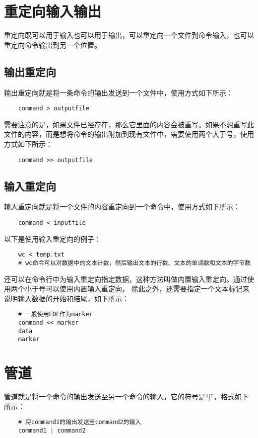 \documentclass[a4paper,left=2.5cm,right=2.5cm,11pt]{article}
\begin{document}
\section{重定向输入输出}
	重定向既可以用于输入也可以用于输出，可以重定向一个文件到命令输入，也可以重定向命令输出到另一个位置。

\subsection{输出重定向}
	输出重定向就是将一条命令的输出发送到一个文件中，使用方式如下所示：
	\begin{lstlisting}
	command > outputfile
	\end{lstlisting}

	需要注意的是，如果文件已经存在，那么它里面的内容会被重写。如果不想重写此文件的内容，而是想将命令的输出附加到现有文件中，需要使用两个大于号，使用方式如下所示：
	\begin{lstlisting}
	command >> outputfile
	\end{lstlisting}

\subsection{输入重定向}
	输入重定向就是将一个文件的内容重定向到一个命令中，使用方式如下所示：
	\begin{lstlisting}
	command < inputfile
	\end{lstlisting}

	以下是使用输入重定向的例子：
	\begin{lstlisting}
	wc < temp.txt
	# wc命令可以对数据中的文本计数，然后输出文本的行数、文本的单词数和文本的字节数
	\end{lstlisting}

	还可以在命令行中为输入重定向指定数据，这种方法叫做内置输入重定向。通过使用两个小于号可以使用内置输入重定向，
	除此之外，还需要指定一个文本标记来说明输入数据的开始和结尾，如下所示：
	\begin{lstlisting}
	# 一般使用EOF作为marker
	command << marker
	data
	marker
	\end{lstlisting}

\section{管道}
	管道就是将一个命令的输出发送至另一个命令的输入，它的符号是“|”，格式如下所示：
	\begin{lstlisting}
	# 将command1的输出发送至command2的输入
	command1 | command2
	\end{lstlisting}
\end{document}
